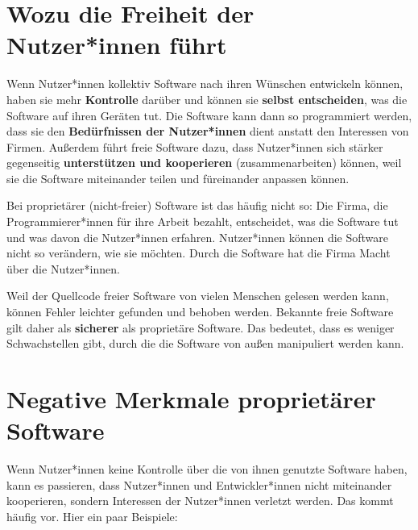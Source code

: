 \documentclass[a5paper,12pt]{scrartcl}
\begin{document}
\section{Wozu die Freiheit der Nutzer*innen führt}

Wenn Nutzer*innen kollektiv Software nach ihren Wünschen entwickeln
können, haben sie mehr \textbf{Kontrolle} darüber und können sie
\textbf{selbst entscheiden}, was die Software auf ihren Geräten
tut. Die Software kann dann so programmiert werden, dass sie den
\textbf{Bedürfnissen der Nutzer*innen} dient anstatt den Interessen
von Firmen. Außerdem führt freie Software dazu, dass Nutzer*innen sich
stärker gegenseitig \textbf{unterstützen und kooperieren}
(zusammenarbeiten) können, weil sie die Software miteinander teilen
und füreinander anpassen können.

Bei proprietärer (nicht-freier) Software ist das häufig nicht so: Die
Firma, die Programmierer*innen für ihre Arbeit bezahlt, entscheidet,
was die Software tut und was davon die Nutzer*innen
erfahren. Nutzer*innen können die Software nicht so verändern, wie sie
möchten. Durch die Software hat die Firma Macht über die
Nutzer*innen.

Weil der Quellcode freier Software von vielen Menschen gelesen werden
kann, können Fehler leichter gefunden und behoben werden. Bekannte
freie Software gilt daher als \textbf{sicherer} als proprietäre
Software. Das bedeutet, dass es weniger Schwachstellen gibt, durch die
die Software von außen manipuliert werden kann.


\section{Negative Merkmale proprietärer Software}

Wenn Nutzer*innen keine Kontrolle über die von ihnen genutzte Software
haben, kann es passieren, dass Nutzer*innen und Entwickler*innen nicht
miteinander kooperieren, sondern Interessen der Nutzer*innen verletzt
werden. Das kommt häufig vor. Hier ein paar Beispiele:
\end{document}
